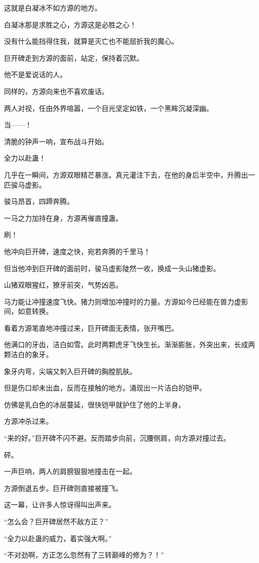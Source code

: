 \begin{this_body}
这就是白凝冰不如方源的地方。

白凝冰那是求胜之心，方源这是必胜之心！

没有什么能挡得住我，就算是灭亡也不能屈折我的魔心。

巨开碑走到方源的面前，站定，保持着沉默。

他不是爱说话的人。

同样的，方源向来也不喜欢废话。

两人对视，任由外界喧嚣，一个目光坚定如铁，一个黑眸沉凝深幽。

当——！

清脆的钟声一响，宣布战斗开始。

全力以赴蛊！

几乎在一瞬间，方源双眼精芒暴涨。真元灌注下去，在他的身后半空中，升腾出一匹骏马虚影。

骏马昂首，四蹄奔腾。

一马之力加持在身，方源再催直撞蛊。

刷！

他冲向巨开碑，速度之快，宛若奔腾的千里马！

但当他冲到巨开碑的面前时，骏马虚影陡然一收，换成一头山猪虚影。

山猪双眼猩红，獠牙前突，气势凶恶。

马力能让冲撞速度飞快。猪力则增加冲撞时的力量。方源如今已经能在兽力虚影间，如意转换。

看着方源笔直地冲撞过来，巨开碑面无表情，张开嘴巴。

他满口的牙齿，洁白如雪。此时两颗虎牙飞快生长。渐渐膨胀，外突出来，长成两颗洁白的象牙。

象牙内弯，尖端又刺入巨开碑的胸膛肌肤。

但是伤口却未出血，反而在接触的地方。涌现出一片洁白的铠甲。

仿佛是乳白色的冰层蔓延，很快铠甲就护住了他的上半身。

方源冲杀过来。

“来的好。”巨开碑不闪不避。反而踏步向前，沉腰侧肩，向方源对撞过去。

砰。

一声巨响，两人的肩膀狠狠地撞击在一起。

方源倒退五步。巨开碑则直接被撞飞。

这一幕，让许多人惊讶得叫出声来。

“怎么会？巨开碑居然不敌方正？”

“全力以赴蛊的威力，着实强大啊。”

“不对劲啊，方正怎么忽然有了三转巅峰的修为？！”


\end{this_body}
